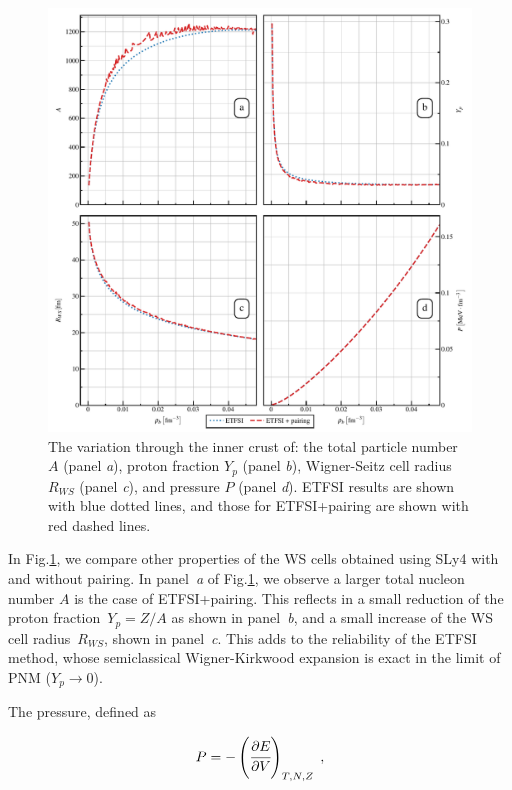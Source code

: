 \documentclass[
    amsmath,amssymb,
    aps,
    prc,
    floatfix,
]{revtex4-2}
\begin{document}
    \begin{figure}
        \centering
        \includegraphics{figs/globalProperties_vs_rho.pdf}
        \caption{The variation through the inner crust of: the total particle number $A$ (panel \emph{a}), proton fraction $Y_p$ (panel \emph{b}), Wigner-Seitz cell radius $R_{WS}$ (panel \emph{c}), and pressure $P$ (panel \emph{d}). ETFSI results are shown with blue dotted lines, and those for ETFSI+pairing are shown with red dashed lines.}
        \label{fig:globalProperties_rho}
    \end{figure}

In Fig.\ref{fig:globalProperties_rho}, we compare other properties of the WS cells obtained using SLy4 with and without pairing. In panel~\emph{a} of Fig.\ref{fig:globalProperties_rho}, we observe a larger total nucleon number $A$ is the case of ETFSI+pairing. This reflects in a small reduction of the proton fraction~$Y_p=Z/A$ as shown in panel~\emph{b}, and a small increase of the WS cell radius~$R_{WS}$, shown in panel~\emph{c}. This adds to the reliability of the ETFSI method, whose semiclassical Wigner-Kirkwood expansion is exact in the limit of PNM ($Y_p\to 0$).

The pressure, defined as
    
    \begin{eqnarray}\label{eqn:pressure}
        P=-\left(\cfrac{\partial E}{\partial V}\right)_{T,N,Z}\;,
    \end{eqnarray}
    
\end{document}
